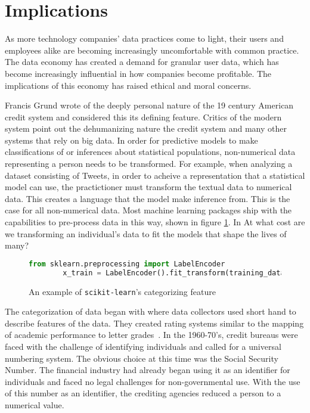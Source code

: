 \section{Implications}
As more technology companies' data practices come to light, their users and
employees alike are becoming increasingly uncomfortable with common practice.
The data economy has created a demand for granular user data, which has become
increasingly influential in how companies become profitable. The implications
of this economy has raised ethical and moral concerns.

Francis Grund wrote of the deeply personal nature of the 19 century
American credit system and considered this its defining feature. Critics of the
modern system point out the dehumanizing nature the credit system and many other
systems that rely on big data. In order for predictive models to make
classifications of or inferences about statistical populations, non-numerical
data representing a person needs to be transformed. For example, when analyzing
a dataset consisting of Tweets, in order to acheive a representation that a
statistical model can use, the practictioner must transform the textual data to
numerical data. This creates a language that the model make inference from. This
is the case for all non-numerical data. Most machine learning packages ship with
the capabilities to pre-process data in this way, shown in figure
\ref{fig:scikit}. In At what cost are we transforming an individual's data to
fit the models that shape the lives of many?

\begin{figure}[h]
\begin{lstlisting}[language=python, basicstyle=\sffamily]
        from sklearn.preprocessing import LabelEncoder
        x_train = LabelEncoder().fit_transform(training_data)
\end{lstlisting}
\caption{An example of \texttt{scikit-learn}'s categorizing feature~\cite{scikit-learn}}
		\label{fig:scikit}
\end{figure}

The categorization of data began with \mca where data collectors used short
hand to describe features of the data. They created rating systems similar to
the mapping of academic performance to letter
grades~\cite{lauer2017creditworthy}. In the 1960-70's, credit bureaus were
faced with the challenge of identifying individuals and called for a universal
numbering system. The obvious choice at this time was the Social Security
Number. The financial industry had already began using it as an identifier for
individuals and faced no legal challenges for non-governmental use. With the
use of this number as an identifier, the crediting agencies reduced a person to
a numerical value.

